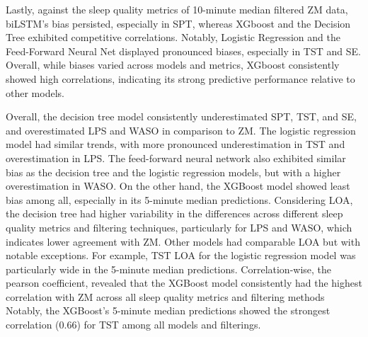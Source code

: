 \documentclass[
  10pt,
]{scrbook}
\begin{document}
Lastly, against the sleep quality metrics of 10-minute median filtered
ZM data, biLSTM's bias persisted, especially in SPT, whereas XGboost and
the Decision Tree exhibited competitive correlations. Notably, Logistic
Regression and the Feed-Forward Neural Net displayed pronounced biases,
especially in TST and SE. Overall, while biases varied across models and
metrics, XGboost consistently showed high correlations, indicating its
strong predictive performance relative to other models.

Overall, the decision tree model consistently underestimated SPT, TST,
and SE, and overestimated LPS and WASO in comparison to ZM. The logistic
regression model had similar trends, with more pronounced
underestimation in TST and overestimation in LPS. The feed-forward
neural network also exhibited similar bias as the decision tree and the
logistic regression models, but with a higher overestimation in WASO. On
the other hand, the XGBoost model showed least bias among all,
especially in its 5-minute median predictions. Considering LOA, the
decision tree had higher variability in the differences across different
sleep quality metrics and filtering techniques, particularly for LPS and
WASO, which indicates lower agreement with ZM. Other models had
comparable LOA but with notable exceptions. For example, TST LOA for the
logistic regression model was particularly wide in the 5-minute median
predictions. Correlation-wise, the pearson coefficient, revealed that
the XGBoost model consistently had the highest correlation with ZM
across all sleep quality metrics and filtering methods Notably, the
XGBoost's 5-minute median predictions showed the strongest correlation
(0.66) for TST among all models and filterings.

\begingroup

\scriptsize
\end{document}
